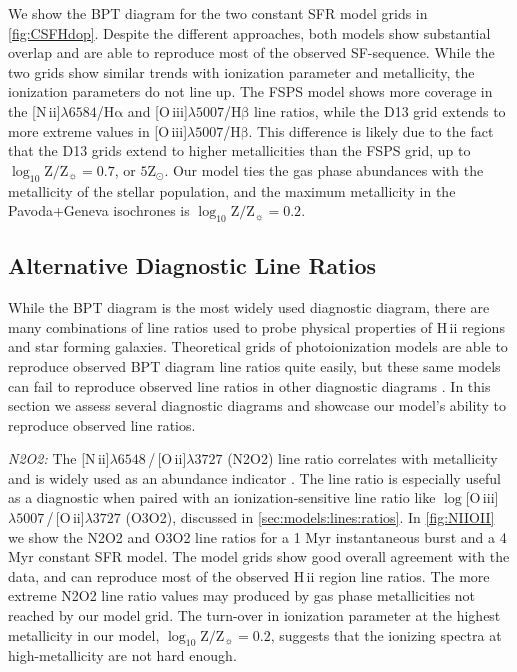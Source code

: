 \documentclass[linenumbers, trackchanges, tighten]{aastex61}%
\newcommand{\Fig}[1]{\autoref{fig:#1}}
\newcommand{\Sec}[1]{\autoref{sec:#1}}
\newcommand{\logten}{\ensuremath{\log_{10}}}
\newcommand{\nii}{[N\,{\sc ii}]\xspace}
\newcommand{\oiii}{[O\,{\sc iii}]\xspace}
\newcommand{\oii}{[O\,{\sc ii}]\xspace}
\newcommand{\ha}{\ensuremath{\mathrm{H\alpha}}}
\newcommand{\hb}{\ensuremath{\mathrm{H\beta}}}
\newcommand{\hii}{H\,{\sc ii}\xspace}
\newcommand\lam[1]{\ensuremath{\lambda #1}}
\newcommand{\logZeq}[1]{\ensuremath{\logten \mathrm{Z}/\mathrm{Z}_{\sun} = #1}}
\newcommand\niiha{\nii{}\lam{6584}/\ha{}}
\newcommand\oiiihb{\oiii{}\lam{5007}/\hb{}}
\begin{document}
We show the BPT diagram for the two constant SFR model grids in \Fig{CSFHdop}. Despite the different approaches, both models show substantial overlap and are able to reproduce most of the observed SF-sequence. While the two grids show similar trends with ionization parameter and metallicity, the ionization parameters do not line up. The FSPS model shows more coverage in the \niiha{} and \oiiihb{} line ratios, while the D13 grid extends to more extreme values in \oiiihb{}. This difference is likely due to the fact that the D13 grids extend to higher metallicities than the FSPS grid, up to \logZeq{0.7}, or $5\mathrm{Z}_{\odot}$. Our model ties the gas phase abundances with the metallicity of the stellar population, and the maximum metallicity in the Pavoda+Geneva isochrones is \logZeq{0.2}.

\subsection{Alternative Diagnostic Line Ratios}\label{sec:models:discussion}

While the BPT diagram is the most widely used diagnostic diagram, there are many combinations of line ratios used to probe physical properties of \hii regions and star forming galaxies. Theoretical grids of photoionization models are able to reproduce observed BPT diagram line ratios quite easily, but these same models can fail to reproduce observed line ratios in other diagnostic diagrams \citep[e.g., ][]{Telford16}. In this section we assess several diagnostic diagrams and showcase our model's ability to reproduce observed line ratios.

{\it N2O2:} The \nii\lam{6548}\,/\,\oii\lam{3727} (N2O2) line ratio correlates with metallicity and is widely used as an abundance indicator \citep{Levesque10, Dopita00, VO87}. The line ratio is especially useful as a diagnostic when paired with an ionization-sensitive line ratio like $\log$\oiii\lam{5007}\,/\,\oii\lam{3727} (O3O2), discussed in \Sec{models:lines:ratios}. In \Fig{NIIOII} we show the N2O2 and O3O2 line ratios for a 1 Myr instantaneous burst and a 4 Myr constant SFR model. The model grids show good overall agreement with the data, and can reproduce most of the observed \hii region line ratios. The more extreme N2O2 line ratio values may produced by gas phase metallicities not reached by our model grid. The turn-over in ionization parameter at the highest metallicity in our model, \logZeq{0.2}, suggests that the ionizing spectra at high-metallicity are not hard enough.
\end{document}
